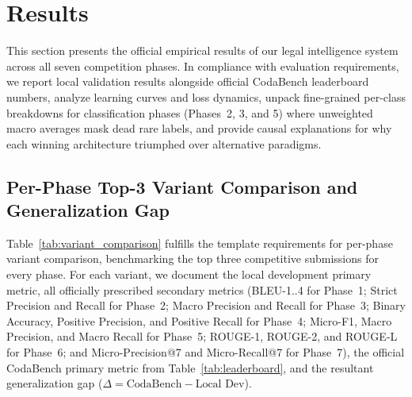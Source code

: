 \documentclass[11pt, oneside]{article}
\begin{document}
\section{Results}
This section presents the official empirical results of our legal intelligence system across all seven competition phases. In compliance with evaluation requirements, we report local validation results alongside official CodaBench leaderboard numbers, analyze learning curves and loss dynamics, unpack fine-grained per-class breakdowns for classification phases (Phases~2, 3, and 5) where unweighted macro averages mask dead rare labels, and provide causal explanations for why each winning architecture triumphed over alternative paradigms.

\subsection{Per-Phase Top-3 Variant Comparison and Generalization Gap}
Table~\ref{tab:variant_comparison} fulfills the template requirements for per-phase variant comparison, benchmarking the top three competitive submissions for every phase. For each variant, we document the local development primary metric, all officially prescribed secondary metrics (BLEU-1..4 for Phase~1; Strict Precision and Recall for Phase~2; Macro Precision and Recall for Phase~3; Binary Accuracy, Positive Precision, and Positive Recall for Phase~4; Micro-F1, Macro Precision, and Macro Recall for Phase~5; ROUGE-1, ROUGE-2, and ROUGE-L for Phase~6; and Micro-Precision@7 and Micro-Recall@7 for Phase~7), the official CodaBench primary metric from Table~\ref{tab:leaderboard}, and the resultant generalization gap ($\Delta = \text{CodaBench} - \text{Local Dev}$).
\end{document}
